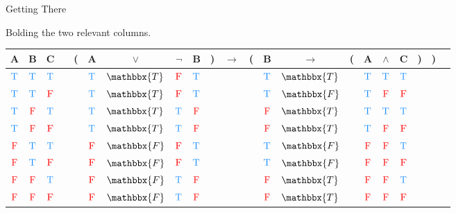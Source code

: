 \documentclass[
  ignorenonframetext,
]{beamer}
\renewcommand{\,}{\text{, }}
\def\True{\textcolor{dodgerblue}{\text{T}}}
\def\False{\textcolor{red}{\text{F}}}
\begin{document}
\begin{frame}{Getting There}
\protect\hypertarget{getting-there}{}

Bolding the two relevant columns.
\begin{center} \begin{tabular}{@{ }c@{ }@{ }c@{ }@{ }c | c@{ }@{}c@{}@{ }c@{ }@{ }c@{ }@{ }c@{ }@{ }c@{ }@{}c@{}@{ }c@{ }@{}c@{}@{ }c@{ }@{ }c@{ }@{}c@{}@{ }c@{ }@{ }c@{ }@{ }c@{ }@{}c@{}@{}c@{}@{ }c} A & B & C &  & ( & A & $\vee$ & $\neg$ & B & ) & $\rightarrow$ & ( & B & $\rightarrow$ & ( & A & $\wedge$ & C & ) & ) & \\ \hline   $\True$ & $\True$ & $\True$ &  &  & $\True$ & $\mathbbx{T}$ & $\False$ & $\True$ &  &&  & $\True$ & $\mathbbx{T}$ &  & $\True$ & $\True$ & $\True$ &  &  & \\  $\True$ & $\True$ & $\False$ &  &  & $\True$ & $\mathbbx{T}$ & $\False$ & $\True$ &  &&  & $\True$ & $\mathbbx{F}$ &  & $\True$ & $\False$ & $\False$ &  &  & \\  $\True$ & $\False$ & $\True$ &  &  & $\True$ & $\mathbbx{T}$ & $\True$ & $\False$ &  &&  & $\False$ & $\mathbbx{T}$ &  & $\True$ & $\True$ & $\True$ &  &  & \\  $\True$ & $\False$ & $\False$ &  &  & $\True$ & $\mathbbx{T}$ & $\True$ & $\False$ &  &&  & $\False$ & $\mathbbx{T}$ &  & $\True$ & $\False$ & $\False$ &  &  & \\  $\False$ & $\True$ & $\True$ &  &  & $\False$ & $\mathbbx{F}$ & $\False$ & $\True$ &  &&  & $\True$ & $\mathbbx{F}$ &  & $\False$ & $\False$ & $\True$ &  &  & \\  $\False$ & $\True$ & $\False$ &  &  & $\False$ & $\mathbbx{F}$ & $\False$ & $\True$ &  &&  & $\True$ & $\mathbbx{F}$ &  & $\False$ & $\False$ & $\False$ &  &  & \\  $\False$ & $\False$ & $\True$ &  &  & $\False$ & $\mathbbx{F}$ & $\True$ & $\False$ &  &&  & $\False$ & $\mathbbx{T}$ &  & $\False$ & $\False$ & $\True$ &  &  & \\  $\False$ & $\False$ & $\False$ &  &  & $\False$ & $\mathbbx{F}$ & $\True$ & $\False$ &  &&  & $\False$ & $\mathbbx{T}$ &  & $\False$ & $\False$ & $\False$ &  &  & \\ \end{tabular} \end{center}

\end{frame}
\end{document}

